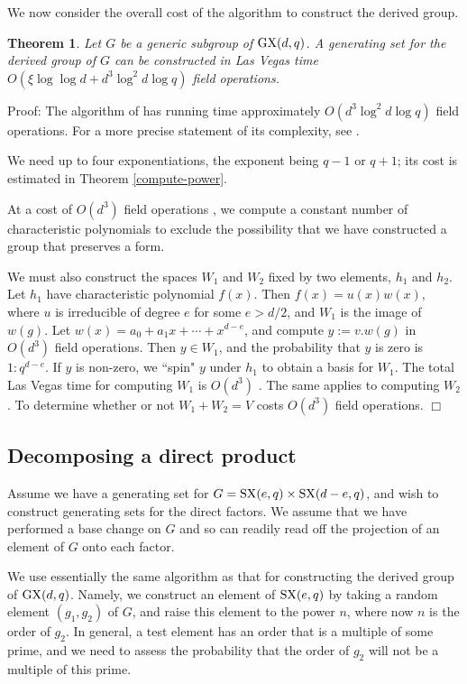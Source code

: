 \documentclass[12pt]{article}
\newtheorem{theorem}[definition]{Theorem}
\newenvironment{proof}{\normalsize {\sc Proof}:}{{\hfill $\Box$ \\}}
\def\SX{{\rm SX}}
\def\GX{{\rm GX}}
\begin{document}
We now consider the overall cost of the algorithm to construct the derived group.
\begin {theorem}
Let $G$ be a generic subgroup of  $\GX(d,q)$. 
A generating set for the derived group of $G$ can be constructed 
in Las Vegas time $O(\xi \log \log d + d^3 \log^2 d \log q)$ field operations.
\end{theorem}
\begin{proof}
The algorithm of \cite{NP} 
has running time approximately $O(d^3\log^2 d\log q)$
field operations. For a more precise statement of its complexity, see \cite{Bath}. 

We need up to four exponentiations, the exponent being $q-1$ or 
$q+1$; its cost is estimated in Theorem \ref{compute-power}.  

At a cost of $O(d^3)$ field operations 
\cite[Section 7.2]{HoltEickOBrien05}, we compute a constant 
number of characteristic polynomials to exclude the possibility that 
we have constructed a group that preserves a form. 

We must also construct the spaces $W_1$ and $W_2$
fixed by two elements, $h_1$ and $h_2$. 
Let $h_1$ have characteristic polynomial $f(x)$.  Then 
$f(x)=u(x)w(x)$, where $u$ is irreducible of degree $e$ for some 
$e>d/2$, and $W_1$ is the image of $w(g)$.  Let $w(x) = 
a_0+a_1x+\cdots+x^{d-e}$, and compute $y := v.w(g)$ in $O(d^3)$ field 
operations.  Then $y\in W_1$,
and the probability that $y$ is zero is $1:q^{d-e}$.  If $y$ is 
non-zero, we ``spin" $y$ under $h_1$
to obtain a basis for $W_1$.
The total Las Vegas time for computing $W_1$ is $O(d^3)$ \cite{HoltRees94}.  
The same applies to computing $W_2$. To determine
whether or not $W_1+W_2=V$ costs $O(d^3)$ field operations.  
\end{proof}

\subsection{Decomposing a direct product}
Assume we have a generating set for $G=\SX(e,q)\times\SX(d-e,q)$, 
and wish to construct generating sets for the direct factors.
We assume that we have performed a base change
on $G$ and so can readily read off the projection of an element
of $G$ onto each factor.

We use essentially the same algorithm as that for constructing the derived 
group of $\GX(d,q)$. 
Namely, we construct an element of $\SX(e,q)$ by taking a random 
element $(g_1,g_2)$ 
of $G$, and raise this element to the power $n$, where 
now $n$ is the order of $g_2$.  In general, a test element has an order that is a 
multiple of some prime, and we need to assess the probability that the 
order of $g_2$ will not be a multiple of this prime.
\end{document}
